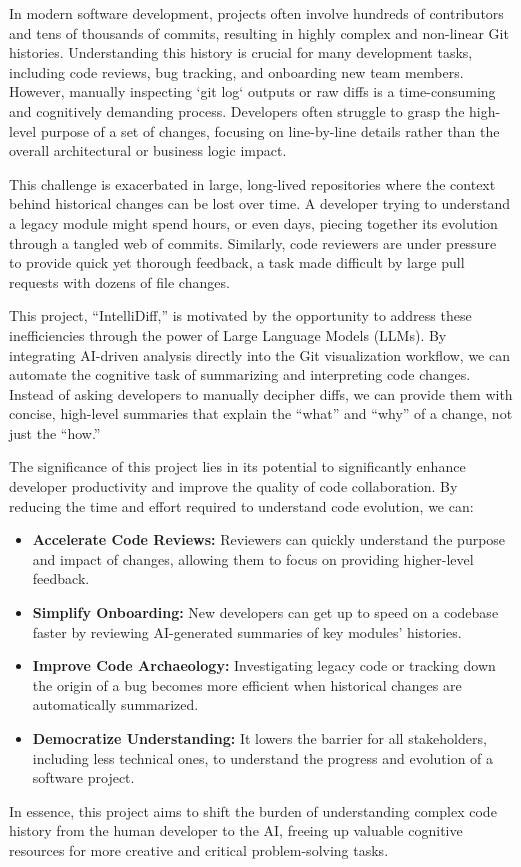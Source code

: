 In modern software development, projects often involve hundreds of contributors and tens of thousands of commits, resulting in highly complex and non-linear Git histories. Understanding this history is crucial for many development tasks, including code reviews, bug tracking, and onboarding new team members. However, manually inspecting `git log` outputs or raw diffs is a time-consuming and cognitively demanding process. Developers often struggle to grasp the high-level purpose of a set of changes, focusing on line-by-line details rather than the overall architectural or business logic impact.

This challenge is exacerbated in large, long-lived repositories where the context behind historical changes can be lost over time. A developer trying to understand a legacy module might spend hours, or even days, piecing together its evolution through a tangled web of commits. Similarly, code reviewers are under pressure to provide quick yet thorough feedback, a task made difficult by large pull requests with dozens of file changes.

This project, ``IntelliDiff,'' is motivated by the opportunity to address these inefficiencies through the power of Large Language Models (LLMs). By integrating AI-driven analysis directly into the Git visualization workflow, we can automate the cognitive task of summarizing and interpreting code changes. Instead of asking developers to manually decipher diffs, we can provide them with concise, high-level summaries that explain the ``what'' and ``why'' of a change, not just the ``how.''

The significance of this project lies in its potential to significantly enhance developer productivity and improve the quality of code collaboration. By reducing the time and effort required to understand code evolution, we can:
\begin{itemize}
    \item \textbf{Accelerate Code Reviews:} Reviewers can quickly understand the purpose and impact of changes, allowing them to focus on providing higher-level feedback.
    \item \textbf{Simplify Onboarding:} New developers can get up to speed on a codebase faster by reviewing AI-generated summaries of key modules' histories.
    \item \textbf{Improve Code Archaeology:} Investigating legacy code or tracking down the origin of a bug becomes more efficient when historical changes are automatically summarized.
    \item \textbf{Democratize Understanding:} It lowers the barrier for all stakeholders, including less technical ones, to understand the progress and evolution of a software project.
\end{itemize}

In essence, this project aims to shift the burden of understanding complex code history from the human developer to the AI, freeing up valuable cognitive resources for more creative and critical problem-solving tasks. 